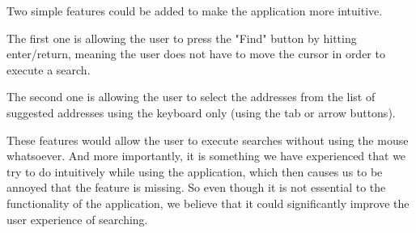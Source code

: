 Two simple features could be added to make the application more intuitive.

The first one is allowing the user to press the "Find" button by hitting enter/return, meaning the user does not have to move the cursor in order to execute a search.

The second one is allowing the user to select the addresses from the list of suggested addresses using the keyboard only (using the tab or arrow buttons).

These features would allow the user to execute searches without using the mouse whatsoever. And more importantly, it is something we have experienced that we try to do intuitively while using the application, which then causes us to be annoyed that the feature is missing. So even though it is not essential to the functionality of the application, we believe that it could significantly improve the user experience of searching.